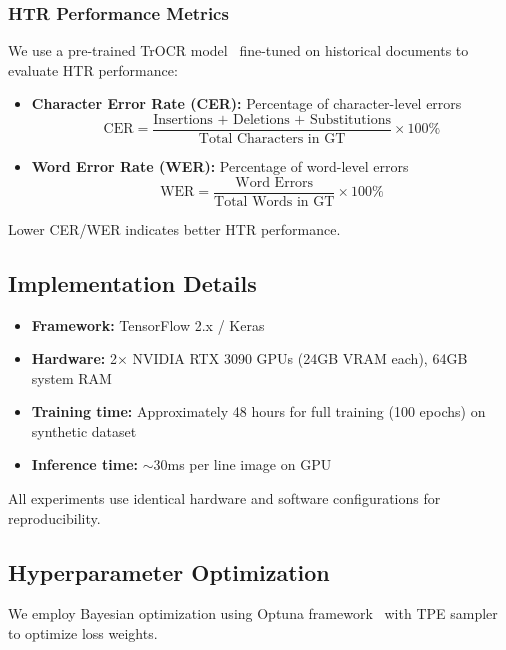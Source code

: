 \documentclass[journal]{IEEEtran}
\begin{document}
\subsubsection{HTR Performance Metrics}

We use a pre-trained TrOCR model~\cite{li2021trocr} fine-tuned on historical documents to evaluate HTR performance:

\begin{itemize}
    \item \textbf{Character Error Rate (CER):} Percentage of character-level errors
    \begin{equation}
    \text{CER} = \frac{\text{Insertions + Deletions + Substitutions}}{\text{Total Characters in GT}} \times 100\%
    \end{equation}
    
    \item \textbf{Word Error Rate (WER):} Percentage of word-level errors
    \begin{equation}
    \text{WER} = \frac{\text{Word Errors}}{\text{Total Words in GT}} \times 100\%
    \end{equation}
\end{itemize}

Lower CER/WER indicates better HTR performance.

\subsection{Implementation Details}

\begin{itemize}
    \item \textbf{Framework:} TensorFlow 2.x / Keras
    \item \textbf{Hardware:} 2× NVIDIA RTX 3090 GPUs (24GB VRAM each), 64GB system RAM
    \item \textbf{Training time:} Approximately 48 hours for full training (100 epochs) on synthetic dataset
    \item \textbf{Inference time:} $\sim$30ms per line image on GPU
\end{itemize}

All experiments use identical hardware and software configurations for reproducibility.

\subsection{Hyperparameter Optimization}

We employ Bayesian optimization using Optuna framework~\cite{akiba2019optuna} with TPE sampler to optimize loss weights.
\end{document}

